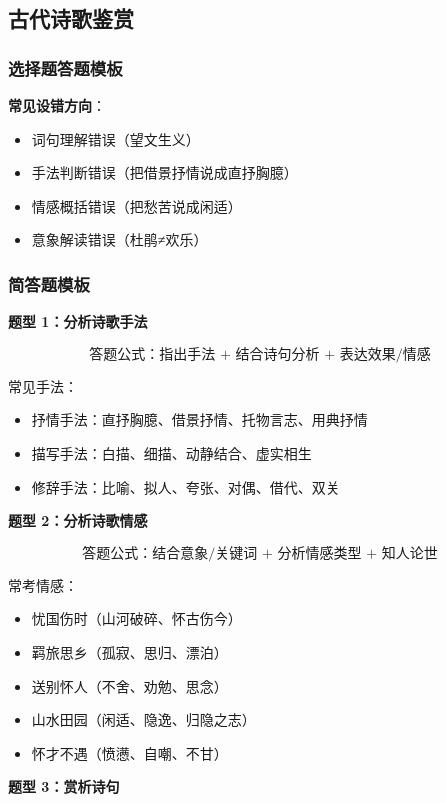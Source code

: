 \subsection{古代诗歌鉴赏}

\subsubsection{选择题答题模板}

\textbf{常见设错方向}：

\begin{itemize}
  \item 词句理解错误（望文生义）
  \item 手法判断错误（把借景抒情说成直抒胸臆）
  \item 情感概括错误（把愁苦说成闲适）
  \item 意象解读错误（杜鹃≠欢乐）
\end{itemize}

\subsubsection{简答题模板}

\textbf{题型 1：分析诗歌手法}

\[
\text{答题公式：指出手法 + 结合诗句分析 + 表达效果/情感}
\]

常见手法：
\begin{itemize}
  \item 抒情手法：直抒胸臆、借景抒情、托物言志、用典抒情
  \item 描写手法：白描、细描、动静结合、虚实相生
  \item 修辞手法：比喻、拟人、夸张、对偶、借代、双关
\end{itemize}

\textbf{题型 2：分析诗歌情感}

\[
\text{答题公式：结合意象/关键词 + 分析情感类型 + 知人论世}
\]

常考情感：
\begin{itemize}
  \item 忧国伤时（山河破碎、怀古伤今）
  \item 羁旅思乡（孤寂、思归、漂泊）
  \item 送别怀人（不舍、劝勉、思念）
  \item 山水田园（闲适、隐逸、归隐之志）
  \item 怀才不遇（愤懑、自嘲、不甘）
\end{itemize}

\textbf{题型 3：赏析诗句}


